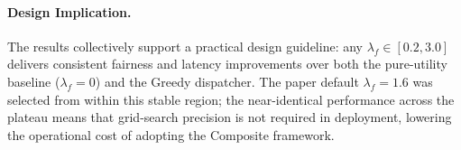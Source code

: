 \paragraph{Design Implication.}
The results collectively support a practical design guideline: any
$\lambda_f \in [0.2, 3.0]$ delivers consistent fairness and latency
improvements over both the pure-utility baseline ($\lambda_f{=}0$) and
the Greedy dispatcher. The paper default $\lambda_f{=}1.6$ was selected
from within this stable region; the near-identical performance across
the plateau means that grid-search precision is not required in
deployment, lowering the operational cost of adopting the Composite
framework.